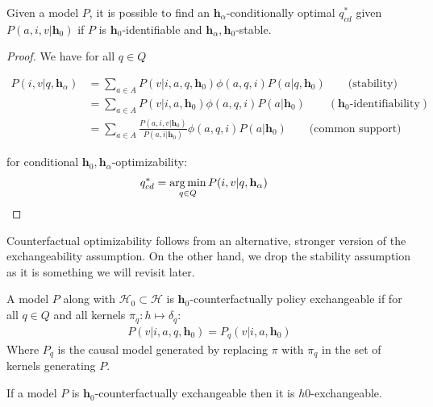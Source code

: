 \begin{theorem}\label{th:conditional_optzy}
Given a model $P$, it is possible to find an $\mathbf{h}_\alpha$-conditionally optimal $q^*_{cd}$ given $P(a,i,v|\mathbf{h}_0)$ if $P$ is $\mathbf{h}_0$-identifiable and $\mathbf{h}_\alpha,\mathbf{h}_0$-stable.
\end{theorem}

\begin{proof}
We have for all $q\in Q$

\begin{align}
   P(i,v|q,\mathbf{h}_\alpha)&=\sum_{a\in A} P(v|i,a,q,\mathbf{h}_0) \phi(a,q,i) P(a|q,\mathbf{h}_0) \qquad\text{(stability)}\\
                    &=\sum_{a\in A} P(v|i,a,\mathbf{h}_0) \phi(a,q,i) P(a|\mathbf{h}_0) \qquad (\mathbf{h}_0\text{-identifiability})\\
                    &=\sum_{a\in A} \frac{P(a,i,v|\mathbf{h}_0)}{P(a,i|\mathbf{h}_0)} \phi(a,q,i) P(a|\mathbf{h}_0)\qquad\text{(common support)}
\end{align}

for conditional $\mathbf{h}_0,\mathbf{h}_\alpha$-optimizability:
\begin{align}
    q^*_{cd} &= \operatorname*{arg\,min}_{q\in Q} P(i,v|q,\mathbf{h}_\alpha)
\end{align}
\end{proof}

Counterfactual optimizability follows from an alternative, stronger version of the exchangeability assumption. On the other hand, we drop the stability assumption as it is something we will revisit later.

\begin{definition}
A model $P$ along with $\mathcal{H}_0\subset\mathcal{H}$ is $\mathbf{h}_0$-counterfactually policy exchangeable if for all $q\in Q$ and all kernels $\pi_q:h\mapsto \delta_q$:
\begin{align}
    P(v|i,a,q,\mathbf{h}_0) = P_q(v|i,a,\mathbf{h}_0)
\end{align}
Where $P_q$ is the causal model generated by replacing $\pi$ with $\pi_q$ in the set of kernels generating $P$.
\end{definition}

\begin{lemma}\label{le:cfex_im_ex}
If a model $P$ is $\mathbf{h}_0$-counterfactually exchangeable then it is $h0$-exchangeable.
\end{lemma}

